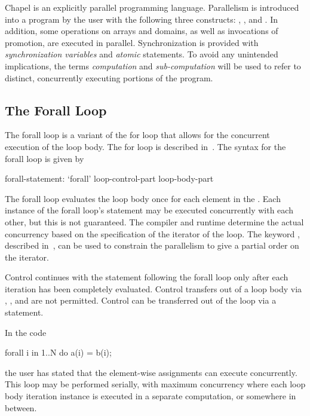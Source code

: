 \label{Parallelism_and_Synchronization}

Chapel is an explicitly parallel programming language.  Parallelism is
introduced into a program by the user with the following three
constructs: , , and .  In
addition, some operations on arrays and domains, as well as
invocations of promotion, are executed in parallel.  Synchronization
is provided with \emph{synchronization variables} and \emph{atomic}
statements.  To avoid any unintended implications, the
terms \emph{computation} and \emph{sub-computation} will be used to
refer to distinct, concurrently executing portions of the program.

\subsection{The Forall Loop}
\label{Forall}

The forall loop is a variant of the for loop that allows for the
concurrent execution of the loop body. The for loop is described
in~. The syntax for the forall loop is given by
\begin{syntax}
forall-statement:
   `forall' loop-control-part loop-body-part
\end{syntax}

The forall loop evaluates the loop body once for each element in
the .  Each instance of the forall loop's
statement may be executed concurrently with each other, but this is
not guaranteed.  The compiler and runtime determine the actual
concurrency based on the specification of the iterator of the loop.
The keyword , described in~, can be
used to constrain the parallelism to give a partial order on the
iterator.

Control continues with the statement following the forall loop only
after each iteration has been completely evaluated.  Control transfers
out of a loop body via , ,
and  are not permitted.  Control can be transferred out
of the loop via a  statement.

\begin{example}
In the code
\begin{chapel}
forall i in 1..N do
  a(i) = b(i);
\end{chapel}
the user has stated that the element-wise assignments can execute
concurrently.  This loop may be performed serially, with maximum
concurrency where each loop body iteration instance is executed in a
separate computation, or somewhere in between.
\end{example}

